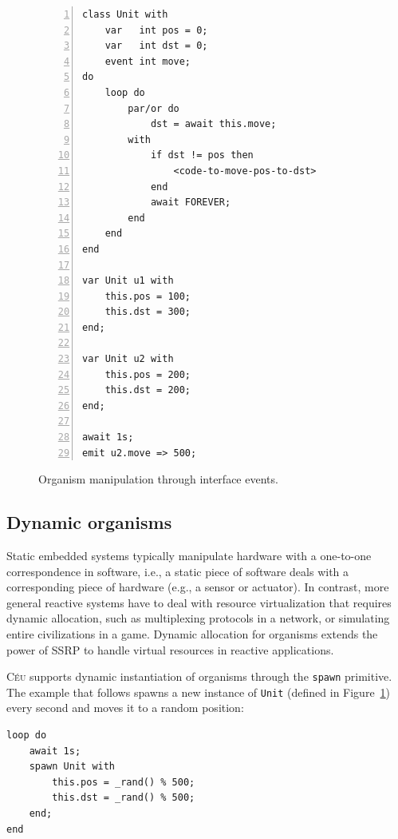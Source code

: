 \documentclass{acm_proc_article-sp}
\newcommand{\CEU}{\textsc{C\'{e}u}\xspace}
\newcommand{\code}[1] {{\small{\texttt{#1}}}}
\newcommand{\1}{\;}
\newcommand{\2}{\;\;}
\newcommand{\3}{\;\;\;}
\newcommand{\5}{\;\;\;\;\;}
\begin{document}
\begin{figure}[t]
\begin{lstlisting}[numbers=left,xleftmargin=3em]
class Unit with
    var   int pos = 0;
    var   int dst = 0;
    event int move;
do
    loop do
        par/or do
            dst = await this.move;
        with
            if dst != pos then
                <code-to-move-pos-to-dst>
            end
            await FOREVER;
        end
    end
end

var Unit u1 with
    this.pos = 100;
    this.dst = 300;
end;

var Unit u2 with
    this.pos = 200;
    this.dst = 200;
end;

await 1s;
emit u2.move => 500;
\end{lstlisting}
\caption{ Organism manipulation through interface events.
\label{lst.unit}
}
\end{figure}

\subsection{Dynamic organisms}

Static embedded systems typically manipulate hardware with a one-to-one 
correspondence in software, i.e., a static piece of software deals with a 
corresponding piece of hardware (e.g., a sensor or actuator).
%
In contrast, more general reactive systems have to deal with resource 
virtualization that requires dynamic allocation, such as multiplexing protocols 
in a network, or simulating entire civilizations in a game.
%
Dynamic allocation for organisms extends the power of SSRP to handle virtual 
resources in reactive applications.

\CEU supports dynamic instantiation of organisms through the \code{spawn} 
primitive.
The example that follows spawns a new instance of \code{Unit} (defined in 
Figure~\ref{lst.unit}) every second and moves it to a random position:

\begin{lstlisting}
loop do
    await 1s;
    spawn Unit with
        this.pos = _rand() % 500;
        this.dst = _rand() % 500;
    end;
end
\end{lstlisting}

\end{document}

